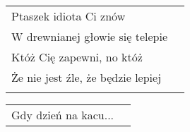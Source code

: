 \documentclass[a5paper]{article}
\begin{document}
\noindent
\begin{tabular}{@{}p{7.50cm}p{3cm}@{}}
Ptaszek idiota Ci znów \\
W drewnianej głowie się telepie\\
Któż Cię zapewni, no któż\\
Że nie jest źle, że będzie lepiej\\\\
\end{tabular}

\noindent
\begin{tabular}{@{}p{7.50cm}p{3cm}@{}}
   Gdy dzień na kacu...
\end{tabular}
\end{document}
